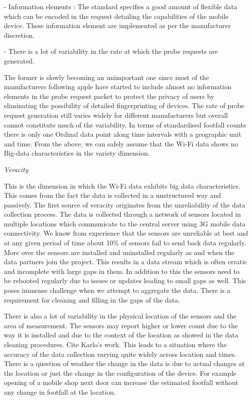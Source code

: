  - Information elements : The standard specifies a good amount of flexible data  which can be encoded in the request detailing the capabilities of the mobile  device.
These information element are implemented as per the manufacturer  discretion.

 - There is a lot of variability in the rate at which the probe requests are  generated.

The former is slowly becoming an unimportant one since most of the manufacturers following apple have started to include almost no information elements in the probe request packet to protect the privacy of users by eliminating the possibility of detailed fingerprinting of devices.
The rate of probe request generation still varies widely for different manufacturers but overall cannot constitute much of the variability.
In terms of standardised footfall counts there is only one Ordinal data point along time intervals with a geographic unit and time.
From the above, we can safely assume that the Wi-Fi data shows no Big-data characteristics in the variety dimension.

\textit{Veracity}

This is the dimension in which the Wi-Fi data exhibits big data characteristics.
This comes from the fact the data is collected in a unstructured way and passively.
The first source of veracity originates from the unreliability of the data collection process.
The data is collected through a network of sensors located in multiple locations which communicate to the central server using 3G mobile data connectivity.
We know from experience that the sensors are unreliable at best and at any given period of time about 10\% of sensors fail to send back data regularly.
More over the sensors are installed and uninstalled regularly as and when the data partners join the project.
This results in a data stream which is often erratic and incomplete with large gaps in them.
In addition to this the sensors need to be rebooted regularly due to issues or updates leading to small gaps as well.
This poses immense challenge when we attempt to aggregate the data.
There is a requirement for cleaning and filling in the gaps of the data.

There is also a lot of variability in the physical location of the sensors and the area of measurement.
The sensors may report higher or lower count due to the way it is installed and due to the context of the location as showed in the data cleaning procedures.
Cite Karlo's work.
This leads to a situation where the accuracy of the data collection varying quite widely across location and times.
There is a question of weather the change in the data is due to actual changes at the location or just the change in the configuration of the device.
For example opening of a mobile shop next door can increase the estimated footfall without any change in footfall at the location.

